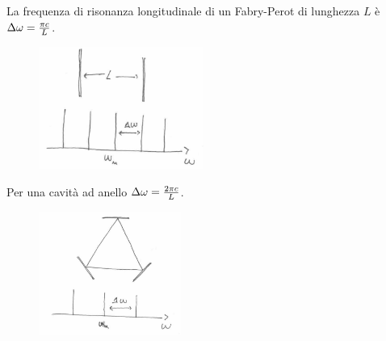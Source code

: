 \begin{example}
\begin{os}
La frequenza di risonanza longitudinale di un
Fabry-Perot di lunghezza $L$ è $\Delta\omega = \frac{\pi c}{L}$.
\end{os}
\begin{figure}[H]
\centering
\includegraphics[height=4cm]{images/14}
\end{figure}
\noindent
Per una cavità ad anello $\Delta\omega = \frac{2\pi c}{L}$.
\begin{figure}[H]
\centering
\includegraphics[height=4cm]{images/15}
\end{figure}
\end{example}

